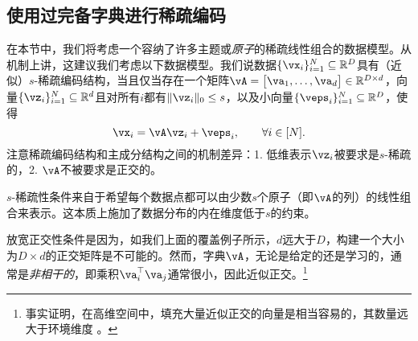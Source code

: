 \documentclass[../../book-main_zh.tex]{subfiles}
\begin{document}
%

\subsection{使用过完备字典进行稀疏编码} 

在本节中，我们将考虑一个容纳了许多主题或\textit{原子}的稀疏线性组合的数据模型。从机制上讲，这建议我们考虑以下数据模型。我们说数据\(\{\vx_{i}\}_{i = 1}^{N} \subseteq \R^{D}\)具有（近似）\(s\)-稀疏编码结构，当且仅当存在一个矩阵\(\vA = \mat{\va_{1}, \dots, \va_{d}} \in \R^{D \times d}\)，向量\(\{\vz_{i}\}_{i = 1}^{N} \subseteq \R^{d}\)且对所有\(i\)都有\(\norm{\vz_{i}}_{0} \leq s\)，以及小向量\(\{\veps_{i}\}_{i = 1}^{N} \subseteq \R^{D}\)，使得
\begin{equation}\label{eq:vectorized_sparse_dl_dgp}
    \vx_{i} = \vA\vz_{i} + \veps_{i}, \qquad \forall i \in [N].
\end{equation}
注意稀疏编码结构和主成分结构之间的机制差异：1. 低维表示\(\vz_{i}\)被要求是\(s\)-稀疏的，2. \(\vA\)不被要求是正交的。

\(s\)-稀疏性条件来自于希望每个数据点都可以由少数\(s\)个原子（即\(\vA\)的列）的线性组合来表示。这本质上施加了数据分布的内在维度低于\(s\)的约束。

放宽正交性条件是因为，如我们上面的覆盖例子所示，\(d\)远大于\(D\)，构建一个大小为\(D \times d\)的正交矩阵是不可能的。然而，字典\(\vA\)，无论是给定的还是学习的，通常是\textit{非相干的}，即乘积\(\va_{i}^{\top}\va_{j}\)通常很小，因此近似正交。\footnote{事实证明，在高维空间中，填充大量近似正交的向量是相当容易的，其数量远大于环境维度 \cite{Wright-Ma-2022}。}
\end{document}

